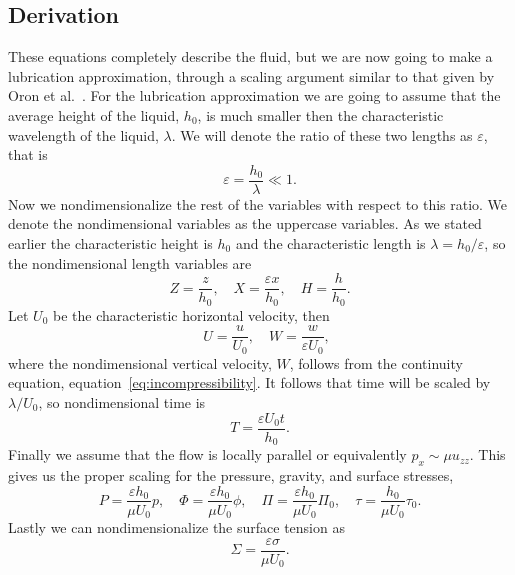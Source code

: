 \subsection{Derivation}
  These equations completely describe the fluid, but we are now going to make a
  lubrication approximation, through a scaling argument similar to that given by Oron
  et al.~\cite{oron1997long}.
  For the lubrication approximation we are going to assume that the average height of
  the liquid, \(h_0\), is much smaller then the characteristic wavelength of the liquid,
  \(\lambda \).
  We will denote the ratio of these two lengths as \(\varepsilon \), that is
  \begin{equation}
    \varepsilon = \frac{h_0}{\lambda} \ll 1.
  \end{equation}
  Now we nondimensionalize the rest of the variables with respect to this ratio.
  We denote the nondimensional variables as the uppercase variables.
  As we stated earlier the characteristic height is \(h_0\) and the characteristic
  length is \(\lambda = h_0/\varepsilon \), so the nondimensional length variables are
  \begin{equation}
    Z = \frac{z}{h_0}, \quad X = \frac{\varepsilon x}{h_0}, \quad H = \frac{h}{h_0}.
  \end{equation}
  Let \(U_0\) be the characteristic horizontal velocity, then
  \begin{equation}
    \quad U = \frac{u}{U_0}, \quad W = \frac{w}{\varepsilon U_0},
  \end{equation}
  where the nondimensional vertical velocity, \(W\), follows from the continuity
  equation, equation~\eqref{eq:incompressibility}.
  It follows that time will be scaled by \(\lambda/U_0\), so nondimensional time is
  \begin{equation}
    T = \frac{\varepsilon U_0 t}{h_0}.
  \end{equation}
  Finally we assume that the flow is locally parallel or equivalently
  \(p_x \sim \mu u_{zz}\).
  This gives us the proper scaling for the pressure, gravity, and surface stresses,
  \begin{equation}
    P = \frac{\varepsilon h_0}{\mu U_0} p, \quad
    \Phi = \frac{\varepsilon h_0}{\mu U_0}\phi, \quad
    \Pi = \frac{\varepsilon h_0}{\mu U_0}\Pi_0, \quad
    \tau = \frac{h_0}{\mu U_0}\tau_0.
  \end{equation}
  Lastly we can nondimensionalize the surface tension as
  \begin{equation}
    \Sigma = \frac{\varepsilon \sigma}{\mu U_0}.
  \end{equation}

